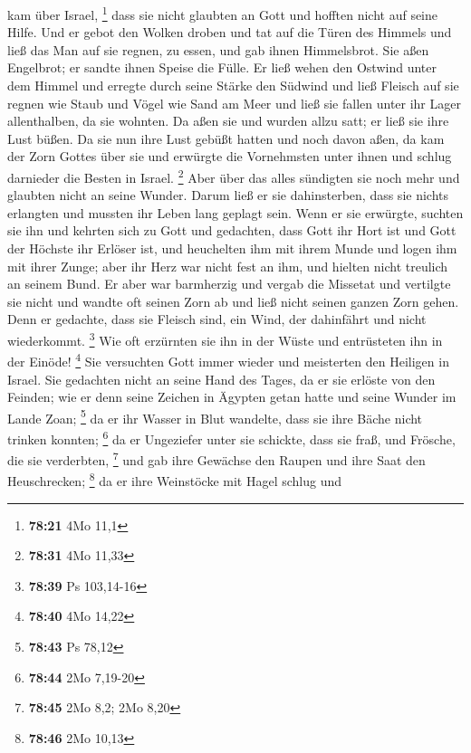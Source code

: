 kam über Israel, \footnote{\textbf{78:21} 4Mo 11,1}  dass
sie nicht glaubten an Gott und hofften nicht auf seine Hilfe.
 Und er gebot den Wolken droben und tat auf die Türen des
Himmels  und ließ das Man auf sie regnen, zu essen, und
gab ihnen Himmelsbrot.  Sie aßen Engelbrot; er sandte
ihnen Speise die Fülle.  Er ließ wehen den Ostwind unter
dem Himmel und erregte durch seine Stärke den Südwind 
und ließ Fleisch auf sie regnen wie Staub und Vögel wie Sand am Meer
 und ließ sie fallen unter ihr Lager allenthalben, da sie
wohnten.  Da aßen sie und wurden allzu satt; er ließ sie
ihre Lust büßen.  Da sie nun ihre Lust gebüßt hatten und
noch davon aßen,  da kam der Zorn Gottes über sie und
erwürgte die Vornehmsten unter ihnen und schlug darnieder die Besten in
Israel. \footnote{\textbf{78:31} 4Mo 11,33}  Aber über
das alles sündigten sie noch mehr und glaubten nicht an seine Wunder.
 Darum ließ er sie dahinsterben, dass sie nichts
erlangten und mussten ihr Leben lang geplagt sein.  Wenn
er sie erwürgte, suchten sie ihn und kehrten sich zu Gott
 und gedachten, dass Gott ihr Hort ist und Gott der
Höchste ihr Erlöser ist,  und heuchelten ihm mit ihrem
Munde und logen ihm mit ihrer Zunge;  aber ihr Herz war
nicht fest an ihm, und hielten nicht treulich an seinem Bund.
 Er aber war barmherzig und vergab die Missetat und
vertilgte sie nicht und wandte oft seinen Zorn ab und ließ nicht seinen
ganzen Zorn gehen.  Denn er gedachte, dass sie Fleisch
sind, ein Wind, der dahinfährt und nicht wiederkommt. \footnote{\textbf{78:39}
  Ps 103,14-16}  Wie oft erzürnten sie ihn in der Wüste
und entrüsteten ihn in der Einöde! \footnote{\textbf{78:40} 4Mo 14,22}
 Sie versuchten Gott immer wieder und meisterten den
Heiligen in Israel.  Sie gedachten nicht an seine Hand
des Tages, da er sie erlöste von den Feinden;  wie er
denn seine Zeichen in Ägypten getan hatte und seine Wunder im Lande
Zoan; \footnote{\textbf{78:43} Ps 78,12}  da er ihr
Wasser in Blut wandelte, dass sie ihre Bäche nicht trinken konnten;
\footnote{\textbf{78:44} 2Mo 7,19-20}  da er Ungeziefer
unter sie schickte, dass sie fraß, und Frösche, die sie verderbten,
\footnote{\textbf{78:45} 2Mo 8,2; 2Mo 8,20}  und gab ihre
Gewächse den Raupen und ihre Saat den Heuschrecken; \footnote{\textbf{78:46}
  2Mo 10,13}  da er ihre Weinstöcke mit Hagel schlug und
